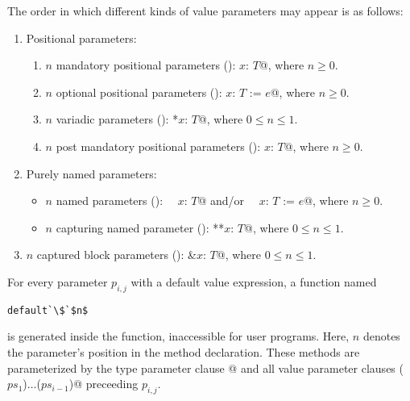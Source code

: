 The order in which different kinds of value parameters may appear is as follows:
\begin{enumerate}
  \item Positional parameters:
    \begin {enumerate}
      \item $n$ mandatory positional parameters (): \lstinline@$x$: $T$@, where $n \ge 0$.

      \item $n$ optional positional parameters (): \lstinline@$x$: $T$ := $e$@, where $n \ge 0$. 

      \item $n$ variadic parameters (): \lstinline@*$x$: $T$@, where $0 \le n \le 1$. 

      \item $n$ post mandatory positional parameters (): \lstinline@$x$: $T$@, where $n \ge 0$.
      
    \end{enumerate}
  
  \item Purely named parameters:
    \begin{itemize}
      \item $n$ named parameters (): ~\lstinline@~$x$: $T$@ and/or ~\lstinline@~$x$: $T$ := $e$@, where $n \ge 0$. 

      \item $n$ capturing named parameter (): \lstinline@**$x$: $T$@, where $0 \le n \le 1$. 
      
    \end{itemize}

  \item $n$ captured block parameters (): \lstinline@&$x$: $T$@, where $0 \le n \le 1$.
\end{enumerate}

For every parameter $p_{i,j}$ with a default value expression, a function named 
\begin{lstlisting}[escapechar=`]
default`\$`$n$
\end{lstlisting}
is generated inside the function, inaccessible for user programs. Here, $n$ denotes the parameter's position in the method declaration. These methods are parameterized by the type parameter clause \lstinline@[$\tps$]@ and all value parameter clauses \lstinline@($ps_1$)$\ldots$($ps_{i-1}$)@ preceeding $p_{i,j}$.

